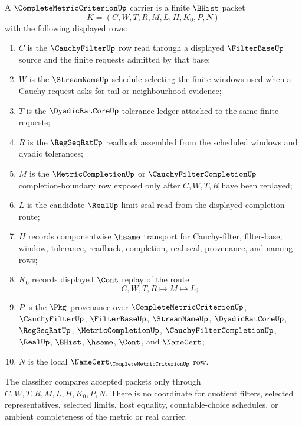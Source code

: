 \begin{definition}
\label{def:complete-metric-criterion-carrier}
A $\CompleteMetricCriterionUp$ carrier is a finite $\BHist$ packet
$$
K=(C,W,T,R,M,L,H,K_0,P,N)
$$
with the following displayed rows:
\begin{enumerate}
\item $C$ is the $\CauchyFilterUp$ row read through a displayed
  $\FilterBaseUp$ source and the finite requests admitted by that base;
\item $W$ is the $\StreamNameUp$ schedule selecting the finite windows used
  when a Cauchy request asks for tail or neighbourhood evidence;
\item $T$ is the $\DyadicRatCoreUp$ tolerance ledger attached to the same
  finite requests;
\item $R$ is the $\RegSeqRatUp$ readback assembled from the scheduled windows
  and dyadic tolerances;
\item $M$ is the $\MetricCompletionUp$ or $\CauchyFilterCompletionUp$
  completion-boundary row exposed only after $C,W,T,R$ have been replayed;
\item $L$ is the candidate $\RealUp$ limit seal read from the displayed
  completion route;
\item $H$ records componentwise $\hsame$ transport for Cauchy-filter,
  filter-base, window, tolerance, readback, completion, real-seal,
  provenance, and naming rows;
\item $K_0$ records displayed $\Cont$ replay of the route
$$
C,W,T,R \longmapsto M \longmapsto L ;
$$
\item $P$ is the $\Pkg$ provenance over $\CompleteMetricCriterionUp$,
  $\CauchyFilterUp$, $\FilterBaseUp$, $\StreamNameUp$, $\DyadicRatCoreUp$,
  $\RegSeqRatUp$, $\MetricCompletionUp$, $\CauchyFilterCompletionUp$,
  $\RealUp$, $\BHist$, $\hsame$, $\Cont$, and $\NameCert$;
\item $N$ is the local $\NameCert_{\CompleteMetricCriterionUp}$ row.
\end{enumerate}
The classifier compares accepted packets only through
$C,W,T,R,M,L,H,K_0,P,N$. There is no coordinate for quotient filters, selected
representatives, selected limits, host equality, countable-choice schedules,
or ambient completeness of the metric or real carrier.
\end{definition}


